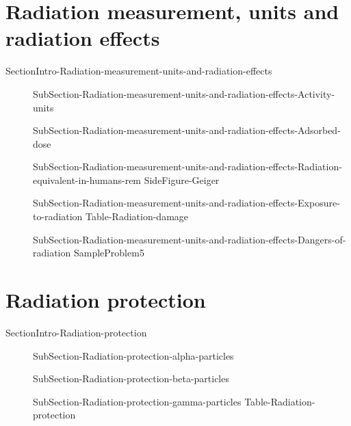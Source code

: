 \documentclass[main.tex]{subfiles}
\begin{document}
\section{Radiation measurement, units and radiation effects}{SectionIntro-Radiation-measurement-units-and-radiation-effects}
\sloppy \begin{description}
\item[] {SubSection-Radiation-measurement-units-and-radiation-effects-Activity-units}
\item[] {SubSection-Radiation-measurement-units-and-radiation-effects-Adsorbed-dose}
\item[] {SubSection-Radiation-measurement-units-and-radiation-effects-Radiation-equivalent-in-humans-rem}
{SideFigure-Geiger}
\item[] {SubSection-Radiation-measurement-units-and-radiation-effects-Exposure-to-radiation}
{Table-Radiation-damage}
\item[] {SubSection-Radiation-measurement-units-and-radiation-effects-Dangers-of-radiation}
{SampleProblem5}
\end{description}



\section{Radiation protection}{SectionIntro-Radiation-protection}
\sloppy \begin{description}
\item[] {SubSection-Radiation-protection-alpha-particles}
\item[] {SubSection-Radiation-protection-beta-particles}
\item[] {SubSection-Radiation-protection-gamma-particles}
{Table-Radiation-protection}
\end{description}
\end{document}
